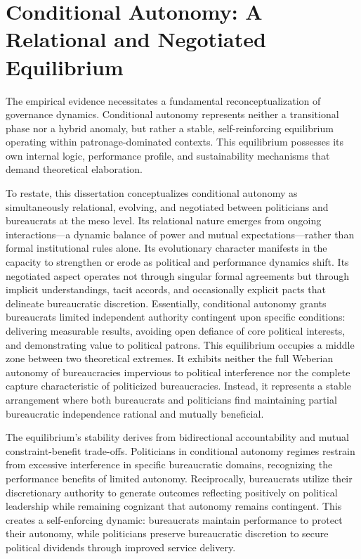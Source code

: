 \section{Conditional Autonomy: A Relational and Negotiated Equilibrium}

The empirical evidence necessitates a fundamental reconceptualization of governance dynamics. Conditional autonomy represents neither a transitional phase nor a hybrid anomaly, but rather a stable, self-reinforcing equilibrium operating within patronage-dominated contexts. This equilibrium possesses its own internal logic, performance profile, and sustainability mechanisms that demand theoretical elaboration.

To restate, this dissertation conceptualizes conditional autonomy as simultaneously relational, evolving, and negotiated between politicians and bureaucrats at the meso level. Its relational nature emerges from ongoing interactions—a dynamic balance of power and mutual expectations—rather than formal institutional rules alone. Its evolutionary character manifests in the capacity to strengthen or erode as political and performance dynamics shift. Its negotiated aspect operates not through singular formal agreements but through implicit understandings, tacit accords, and occasionally explicit pacts that delineate bureaucratic discretion. Essentially, conditional autonomy grants bureaucrats limited independent authority contingent upon specific conditions: delivering measurable results, avoiding open defiance of core political interests, and demonstrating value to political patrons. This equilibrium occupies a middle zone between two theoretical extremes. It exhibits neither the full Weberian autonomy of bureaucracies impervious to political interference nor the complete capture characteristic of politicized bureaucracies. Instead, it represents a stable arrangement where both bureaucrats and politicians find maintaining partial bureaucratic independence rational and mutually beneficial.

The equilibrium's stability derives from bidirectional accountability and mutual constraint-benefit trade-offs. Politicians in conditional autonomy regimes restrain from excessive interference in specific bureaucratic domains, recognizing the performance benefits of limited autonomy. Reciprocally, bureaucrats utilize their discretionary authority to generate outcomes reflecting positively on political leadership while remaining cognizant that autonomy remains contingent. This creates a self-enforcing dynamic: bureaucrats maintain performance to protect their autonomy, while politicians preserve bureaucratic discretion to secure political dividends through improved service delivery.

